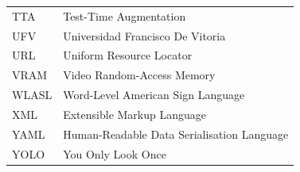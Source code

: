 \begin{longtable}{@{}p{3.0cm}p{10.5cm}@{}}
        TTA              & Test-Time Augmentation                                  \\
        UFV              & Universidad Francisco De Vitoria                        \\
        URL              & Uniform Resource Locator                                \\
        VRAM             & Video Random-Access Memory                              \\
        WLASL            & Word-Level American Sign Language                       \\
        XML              & Extensible Markup Language                              \\
        YAML             & Human-Readable Data Serialisation Language              \\
        YOLO             & You Only Look Once                                      \\
        \bottomrule
    \end{longtable}
\endgroup

